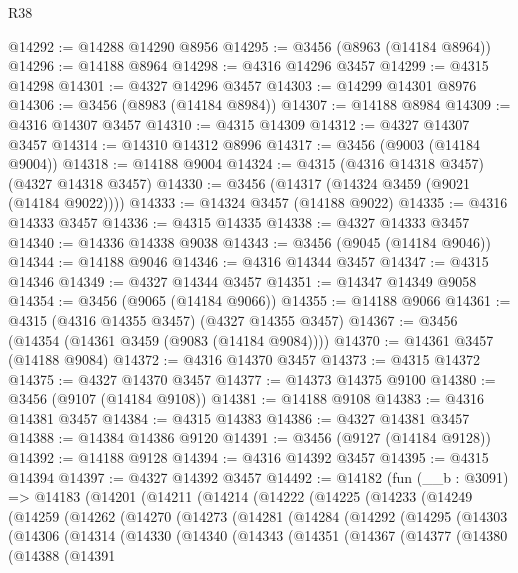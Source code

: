 \begin{lexlean}{R38}
\begin{coremodule}
@14292 := @14288 @14290 @8956
@14295 := @3456 (@8963 (@14184 @8964))
@14296 := @14188 @8964
@14298 := @4316 @14296 @3457
@14299 := @4315 @14298
@14301 := @4327 @14296 @3457
@14303 := @14299 @14301 @8976
@14306 := @3456 (@8983 (@14184 @8984))
@14307 := @14188 @8984
@14309 := @4316 @14307 @3457
@14310 := @4315 @14309
@14312 := @4327 @14307 @3457
@14314 := @14310 @14312 @8996
@14317 := @3456 (@9003 (@14184 @9004))
@14318 := @14188 @9004
@14324 := @4315 (@4316 @14318 @3457) (@4327 @14318 @3457)
@14330 := @3456 (@14317 (@14324 @3459 (@9021 (@14184 @9022))))
@14333 := @14324 @3457 (@14188 @9022)
@14335 := @4316 @14333 @3457
@14336 := @4315 @14335
@14338 := @4327 @14333 @3457
@14340 := @14336 @14338 @9038
@14343 := @3456 (@9045 (@14184 @9046))
@14344 := @14188 @9046
@14346 := @4316 @14344 @3457
@14347 := @4315 @14346
@14349 := @4327 @14344 @3457
@14351 := @14347 @14349 @9058
@14354 := @3456 (@9065 (@14184 @9066))
@14355 := @14188 @9066
@14361 := @4315 (@4316 @14355 @3457) (@4327 @14355 @3457)
@14367 := @3456 (@14354 (@14361 @3459 (@9083 (@14184 @9084))))
@14370 := @14361 @3457 (@14188 @9084)
@14372 := @4316 @14370 @3457
@14373 := @4315 @14372
@14375 := @4327 @14370 @3457
@14377 := @14373 @14375 @9100
@14380 := @3456 (@9107 (@14184 @9108))
@14381 := @14188 @9108
@14383 := @4316 @14381 @3457
@14384 := @4315 @14383
@14386 := @4327 @14381 @3457
@14388 := @14384 @14386 @9120
@14391 := @3456 (@9127 (@14184 @9128))
@14392 := @14188 @9128
@14394 := @4316 @14392 @3457
@14395 := @4315 @14394
@14397 := @4327 @14392 @3457
@14492 := @14182
    (fun (__b : @3091) =>
    @14183
      (@14201
        (@14211
          (@14214
            (@14222
              (@14225
                (@14233
                  (@14249
                    (@14259
                      (@14262
                        (@14270
                          (@14273
                            (@14281
                              (@14284
                                (@14292
                                  (@14295
                                    (@14303
                                      (@14306
                                        (@14314
                                          (@14330
                                            (@14340
                                              (@14343
                                                (@14351
                                                  (@14367
                                                    (@14377
                                                      (@14380
                                                        (@14388
                                                          (@14391

\end{coremodule}
\end{lexlean}
